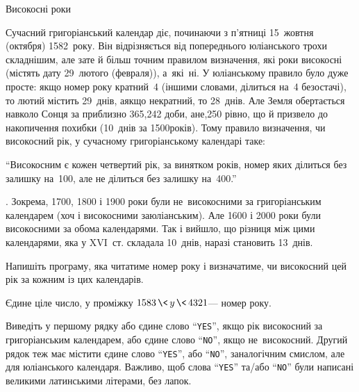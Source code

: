 \begin{problemAllDefault}{Високосні роки}
\label{prob:201516-oioi-A-leap-years-easy}

Сучасний григоріанський календар діє, починаючи з п'ятниці 15~жовтня (октября) 1582~року. Він відрізняється від попереднього юліанського трохи складнішим, але зате й більш точним правилом визначення, які роки високосні (містять дату 29~лютого (февраля)), а~які~ні.
У юліанському правило було дуже просте: якщо номер року кратний~4 (іншими словами, ділиться на~4 без\nolinebreak[3] остачі), то лютий містить 29~днів, а\nolinebreak[3] якщо не\nolinebreak[3] кратний, то 28~днів. Але Земля обертається навколо Сонця за приблизно 365,242 доби, а\nolinebreak[3] не,250 рівно, що й призвело до накопичення похибки (10~днів за 1500\nolinebreak[3] років).
Тому правило визначення, чи високосний рік, у сучасному григоріанському календарі таке: \begin{bfseries}\begin{slshape}``Високосним є кожен четвертий рік, за винятком років, номер яких ділиться без залишку на~100, але не ділиться без залишку на~400.''\end{slshape}\end{bfseries}. Зокрема, 1700, 1800 і 1900 роки були не~високосними за григоріанським календарем (хоч і високосними за\nolinebreak[3] юліанським). Але 1600 і 2000 роки були високосними за обома календарями.
Так і вийшло, що різниця між цими календарями, яка у XVI~ст. складала 10~днів, наразі становить 13~днів.

Напишіть програму, яка читатиме номер року і визначатиме, чи високосний цей рік за кожним із цих календарів.



\InputFile  
Єдине ціле число, у проміжку ${1583\,{\<}\,y\,{\<}\,4321}$\nolinebreak[3] --- номер року.

\OutputFile 
Виведіть у першому рядку або єдине слово ``\texttt{YES}'', якщо рік високосний за григоріанським календарем, або єдине слово ``\texttt{NO}'', якщо не~високосний.
Другий рядок теж має містити єдине слово ``\texttt{YES}'', або ``\texttt{NO}'', з\nolinebreak[3] аналогічним смислом, але для юліанського календаря.
Важливо, щоб слова ``\texttt{YES}'' та/або ``\texttt{NO}'' були написані великими латинськими літерами, без лапок.

\Examples
\begin{exampleSimple}{3em}{3em}%
%
%
\end{exampleSimple}
\begin{exampleSimple}{3em}{3em}%
%
%
\end{exampleSimple}


\end{problemAllDefault}